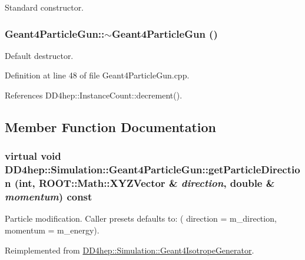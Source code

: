 Standard constructor. \hypertarget{class_d_d4hep_1_1_simulation_1_1_geant4_particle_gun_a96f52fd8078d74c591d410facb13fe21}{
\subsubsection[{$\sim$Geant4ParticleGun}]{\setlength{\rightskip}{0pt plus 5cm}Geant4ParticleGun::$\sim$Geant4ParticleGun ()}}
\label{class_d_d4hep_1_1_simulation_1_1_geant4_particle_gun_a96f52fd8078d74c591d410facb13fe21}


Default destructor. 

Definition at line 48 of file Geant4ParticleGun.cpp.

References DD4hep::InstanceCount::decrement().

\subsection{Member Function Documentation}
\hypertarget{class_d_d4hep_1_1_simulation_1_1_geant4_particle_gun_a38c98b33bbe2f7064bce8c9f4345f262}{
\subsubsection[{getParticleDirection}]{\setlength{\rightskip}{0pt plus 5cm}virtual void DD4hep::Simulation::Geant4ParticleGun::getParticleDirection (int, \/  ROOT::Math::XYZVector \& {\em direction}, \/  double \& {\em momentum}) const}}
\label{class_d_d4hep_1_1_simulation_1_1_geant4_particle_gun_a38c98b33bbe2f7064bce8c9f4345f262}


Particle modification. Caller presets defaults to: ( direction = m\_\-direction, momentum = m\_\-energy). 

Reimplemented from \hyperlink{class_d_d4hep_1_1_simulation_1_1_geant4_isotrope_generator_af4fcebcc7a5e4c13a458200d03b07f33}{DD4hep::Simulation::Geant4IsotropeGenerator}.

